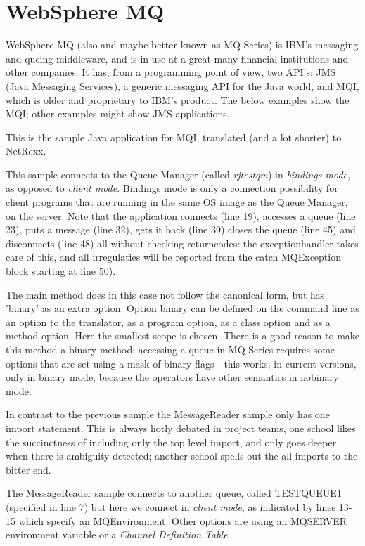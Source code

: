 \chapter{WebSphere MQ}
WebSphere MQ (also and maybe better known as MQ Series) is IBM's
messaging and queing middleware, and is in use at a great many financial
institutions and other companies. It has, from a programming point of
view, two API's: JMS (Java Messaging Services), a generic messaging
API for the Java world, and MQI, which is older and proprietary to
IBM's product. The below examples show the MQI; other examples might
show JMS applications.

This is the sample Java application for MQI, translated (and a lot
shorter) to NetRexx.

This sample connects to the Queue Manager (called \emph{rjtestqm}) in
\emph{bindings mode}, as opposed to \emph{client mode}. Bindings mode
is only a connection possibility for client programs that are running
in the same OS image as the Queue Manager, on the server. Note that
the application connects (line 19), accesses a queue (line 23), puts a
message (line 32), gets it back (line 39) closes the queue (line 45) and disconnects (line 48) all without checking
returncodes: the exceptionhandler takes care of this, and all
irregulaties will be reported from the catch MQException block
starting at line 50).

The main method does in this case not follow the canonical form, but
has 'binary' as an extra option. Option binary can be defined on the
command line as an option to the translator, as a program option, as a
class option and as a method option. Here the smallest scope is
chosen. There is a good reason to make this method a binary method:
accessing a queue in MQ Series requires some options that are set
using a mask of binary flags - this works, in current \nr{} versions,
only in binary mode, because the operators have other semantics in
nobinary mode.


In contrast to the previous sample the MessageReader sample only has
one import statement. This is always hotly debated in project teams,
one school likes the succinctness of including only the top level
import, and only goes deeper when there is ambiguity detected; another
school spells out the all imports to the bitter end. 

The MessageReader sample connects to another queue, called TESTQUEUE1
(specified in line 7) but here we connect in \emph{client mode}, as
indicated by lines 13-15 which specify an MQEnvironment. Other
options are using an MQSERVER environment variable or a \emph{Channel
Definition Table}.

